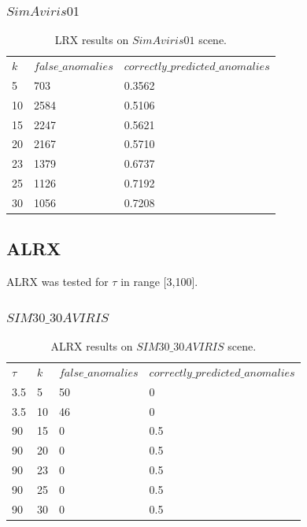 \subsubsection{$SimAviris01$}
 \begin{table}[H]
\centering
 \resizebox{1.1\textwidth}{!}
{\begin{tabular}{l|l|l}
\textbf{$k$} & $false\_anomalies$ & $correctly\_predicted\_anomalies$\\
5 & 703&0.3562 \\
10 &2584 &0.5106 \\
15 & 2247&0.5621 \\
20 & 2167&0.5710 \\
23 & 1379&0.6737 \\
25 & 1126&0.7192 \\
30 &1056 &0.7208 \\

\end{tabular}}
\caption{LRX results on $SimAviris01$ scene.}
\label{tab:LRX_sim_avirirs01}
\end{table}


\subsection{ALRX}
ALRX was tested for $\tau$ in range [3,100]. 

\subsubsection{$SIM30\_30AVIRIS$}

 \begin{table}[H]
\centering
 \resizebox{1.1\textwidth}{!}
{\begin{tabular}{l|l|l|l}
\textbf{$\tau$} &\textbf{$k$} & $false\_anomalies$ & $correctly\_predicted\_anomalies$\\
3.5&5 &50 & 0 \\
3.5&10 &46 &0 \\
90&15 & 0&0.5 \\
90&20 & 0&0.5 \\
90&23&0&0.5\\
90&25 &0 &0.5\\
90&30 & 0&0.5 \\

\end{tabular}}
\caption{ALRX results on $SIM30\_30AVIRIS$ scene.}
\label{tab:ALRX_simAviris30_30}
\end{table}



